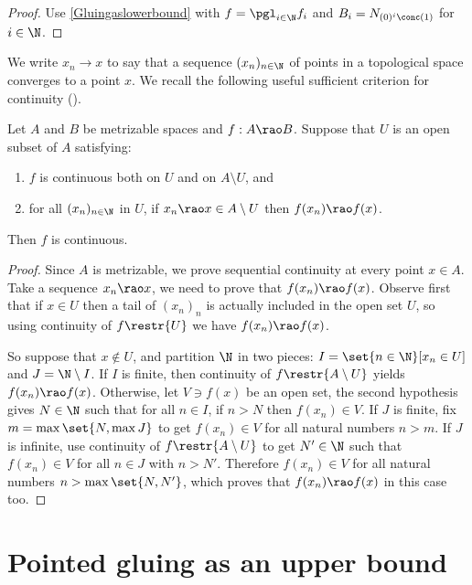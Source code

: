 \begin{proof}
Use \cref{Gluingaslowerbound} with $f=\pgl_{i\in \N} f_i$ and $B_i=N_{(0)^i\conc(1)}$ for ${i\in \N}$.
\end{proof}

We write $x_n\to x$ to say that a sequence $(x_n)_{n\in\N}$ of points in a topological space converges to a point $x$.
We recall the following useful sufficient criterion for continuity (\cite[Claim 3.2]{carroy2013quasi}).

\begin{lemma}\label{prop:sufficientcondforcont}
Let $A$ and $B$ be metrizable spaces and $f:A\rao B$.
Suppose that $U$ is an open subset of $A$ satisfying:
\begin{enumerate}
\item $f$ is continuous both on $U$ and on $A\setminus U$, and
\item for all $(x_n)_{n\in\N}$ in $U$, if $x_n\rao x\in A\setminus U$ then $f(x_n)\rao f(x)$.
\end{enumerate}
Then $f$ is continuous.
\end{lemma}

\begin{proof}
Since $A$ is metrizable, we prove sequential continuity at every point $x\in A$. Take a sequence $x_n\rao x$, we need to prove that $f(x_n)\rao f(x)$.
Observe first that if $x\in U$ then a tail of $(x_n)_n$ is actually included in the open set $U$, so using continuity of $f\restr{U}$ we have $f(x_n)\rao f(x)$.

So suppose that $x\notin U$, and partition $\N$ in two pieces: $I=\set{n\in\N}[x_n\in U]$ and $J=\N\setminus I$.
If $I$ is finite, then continuity of $f\restr{A\setminus U}$ yields $f(x_n)\rao f(x)$.
Otherwise, let $V\ni f(x)$ be an open set, the second hypothesis gives $N\in \N$ such that for all $n\in I$, if $n>N$ then $f(x_n)\in V$.
If $J$ is finite, fix $m=\max\set{N, \max J}$ to get $f(x_n)\in V$ for all natural numbers $n>m$.
If $J$ is infinite, use continuity of $f\restr{A\setminus U}$ to get $N'\in \N$ such that $f(x_n)\in V$ for all $n\in J$ with $n>N'$.
Therefore $f(x_n)\in V$ for all natural numbers $n>\max\set{N,N'}$, which proves that $f(x_n)\rao f(x)$ in this case too.
\end{proof}

\section{Pointed gluing as an upper bound}

